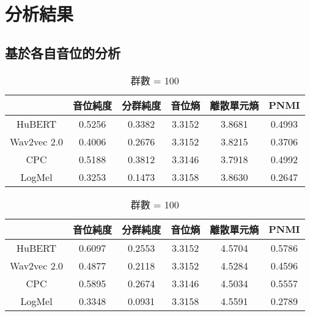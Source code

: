 
\section{分析結果}

\subsection{基於各自音位的分析}
\begin{table}[!htbp]
    \centering
    \begin{subtable}[t]{\textwidth}
        \centering
        \begin{tabular}{|c|c|c|c|c|c|} \hline
                        & 音位純度   & 分群純度   & 音位熵    & 離散單元熵  & PNMI   \\ \hline
            HuBERT      & 0.5256 & 0.3382 & 3.3152 & 3.8681 & 0.4993 \\ \hline    %
            Wav2vec 2.0 & 0.4006 & 0.2676 & 3.3152 & 3.8215 & 0.3706 \\ \hline    %
            CPC         & 0.5188 & 0.3812 & 3.3146 & 3.7918 & 0.4992 \\ \hline    %
            LogMel      & 0.3253 & 0.1473 & 3.3158 & 3.8630 & 0.2647 \\ \hline    %
        \end{tabular}
        \caption{群數 = 50}
        \label{tab:ch3-clu050-phn}
    \end{subtable}

    \vspace{0.5cm}

    \begin{subtable}[t]{\textwidth}
        \centering
        \begin{tabular}{|c|c|c|c|c|c|} \hline
                        & 音位純度   & 分群純度   & 音位熵    & 離散單元熵  & PNMI   \\ \hline
            HuBERT      & 0.6097 & 0.2553 & 3.3152 & 4.5704 & 0.5786 \\ \hline    %
            Wav2vec 2.0 & 0.4877 & 0.2118 & 3.3152 & 4.5284 & 0.4596 \\ \hline    %
            CPC         & 0.5895 & 0.2674 & 3.3146 & 4.5034 & 0.5557 \\ \hline    %
            LogMel      & 0.3348 & 0.0931 & 3.3158 & 4.5591 & 0.2789 \\ \hline    %
        \end{tabular}
        \caption{群數 = 100}
        \label{tab:ch3-clu100-phn}
    \end{subtable}


\end{table}
